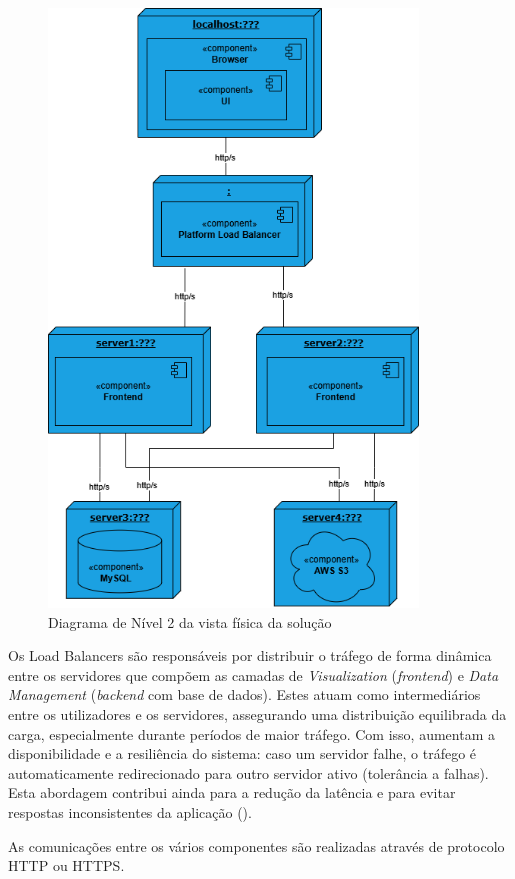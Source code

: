 \begin{figure}[H]
    \centering
    \includegraphics[height=6.25in,keepaspectratio]{frontmatter/assets/diagrams/Physical View/physical_view_lv2.drawio.png}
    \caption{Diagrama de Nível 2 da vista física da solução}
    \label{fig:physical_view_lv2}
\end{figure}

Os Load Balancers são responsáveis por distribuir o tráfego de forma dinâmica entre os servidores que compõem as camadas de \textit{Visualization} (\textit{frontend}) e \textit{Data Management} (\textit{backend} com base de dados). Estes atuam como intermediários entre os utilizadores e os servidores, assegurando uma distribuição equilibrada da carga, especialmente durante períodos de maior tráfego. Com isso, aumentam a disponibilidade e a resiliência do sistema: caso um servidor falhe, o tráfego é automaticamente redirecionado para outro servidor ativo (tolerância a falhas). Esta abordagem contribui ainda para a redução da latência e para evitar respostas inconsistentes da aplicação (\Cite{F52025}).

As comunicações entre os vários componentes são realizadas através de protocolo HTTP ou HTTPS.

